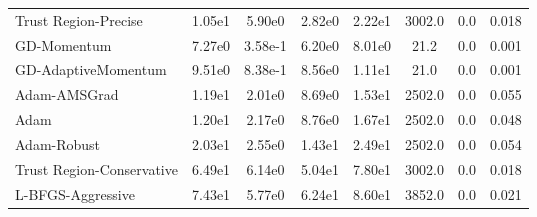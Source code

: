 \documentclass{article}
\begin{document}
\begin{table}[htbp]
{\begin{tabular}{p{2.5cm}*{7}{c}}
Trust Region-Precise & 1.05e1 & 5.90e0 & 2.82e0 & 2.22e1 & 3002.0 & 0.0 & 0.018 \\
GD-Momentum & 7.27e0 & 3.58e-1 & 6.20e0 & 8.01e0 & 21.2 & 0.0 & 0.001 \\
GD-AdaptiveMomentum & 9.51e0 & 8.38e-1 & 8.56e0 & 1.11e1 & 21.0 & 0.0 & 0.001 \\
Adam-AMSGrad & 1.19e1 & 2.01e0 & 8.69e0 & 1.53e1 & 2502.0 & 0.0 & 0.055 \\
Adam & 1.20e1 & 2.17e0 & 8.76e0 & 1.67e1 & 2502.0 & 0.0 & 0.048 \\
Adam-Robust & 2.03e1 & 2.55e0 & 1.43e1 & 2.49e1 & 2502.0 & 0.0 & 0.054 \\
Trust Region-Conservative & 6.49e1 & 6.14e0 & 5.04e1 & 7.80e1 & 3002.0 & 0.0 & 0.018 \\
L-BFGS-Aggressive & 7.43e1 & 5.77e0 & 6.24e1 & 8.60e1 & 3852.0 & 0.0 & 0.021 \\
\bottomrule
\end{tabular}
}
\end{table}
\end{document}
